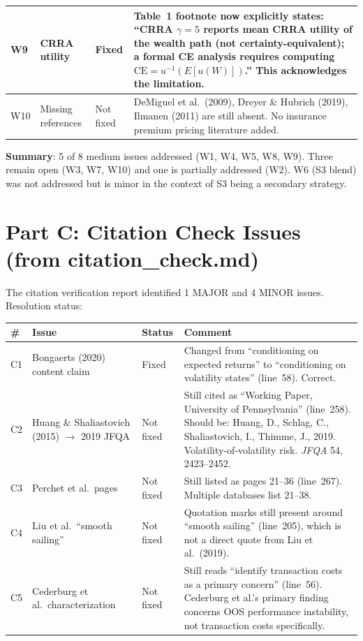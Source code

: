 \documentclass[12pt,a4paper]{article}
\begin{document}
\begin{longtable}{p{0.6cm}p{2.2cm}p{2cm}p{8.5cm}}
\midrule
W9 & CRRA utility & \textcolor{okgreen}{Fixed} & Table~1 footnote now explicitly states: ``CRRA $\gamma\!=\!5$ reports mean CRRA utility of the wealth path (not certainty-equivalent); a formal CE analysis requires computing $\text{CE} = u^{-1}(E[u(W)])$.'' This acknowledges the limitation. \\
\midrule
W10 & Missing references & \textcolor{warncolor}{Not fixed} & DeMiguel et al.\ (2009), Dreyer \& Hubrich (2019), Ilmanen (2011) are still absent. No insurance premium pricing literature added. \\
\bottomrule
\end{longtable}

\textbf{Summary}: 5 of 8 medium issues addressed (W1, W4, W5, W8, W9). Three remain open (W3, W7, W10) and one is partially addressed (W2). W6 (S3 blend) was not addressed but is minor in the context of S3 being a secondary strategy.

\section*{Part C: Citation Check Issues (from citation\_check.md)}

The citation verification report identified 1 MAJOR and 4 MINOR issues. Resolution status:

\begin{longtable}{p{0.6cm}p{3cm}p{2cm}p{7.8cm}}
\toprule
\# & Issue & Status & Comment \\
\midrule
C1 & Bongaerts (2020) content claim & \textcolor{okgreen}{Fixed} & Changed from ``conditioning on expected returns'' to ``conditioning on volatility states'' (line~58). Correct. \\
\midrule
C2 & Huang \& Shaliastovich (2015) $\to$ 2019 JFQA & \textcolor{warncolor}{Not fixed} & Still cited as ``Working Paper, University of Pennsylvania'' (line~258). Should be: Huang, D., Schlag, C., Shaliastovich, I., Thimme, J., 2019. Volatility-of-volatility risk. \textit{JFQA} 54, 2423--2452. \\
\midrule
C3 & Perchet et al.\ pages & \textcolor{warncolor}{Not fixed} & Still listed as pages 21--36 (line~267). Multiple databases list 21--38. \\
\midrule
C4 & Liu et al.\ ``smooth sailing'' & \textcolor{warncolor}{Not fixed} & Quotation marks still present around ``smooth sailing'' (line~205), which is not a direct quote from Liu et al.\ (2019). \\
\midrule
C5 & Cederburg et al.\ characterization & \textcolor{warncolor}{Not fixed} & Still reads ``identify transaction costs as a primary concern'' (line~56). Cederburg et al.'s primary finding concerns OOS performance instability, not transaction costs specifically. \\
\bottomrule
\end{longtable}
\end{document}
